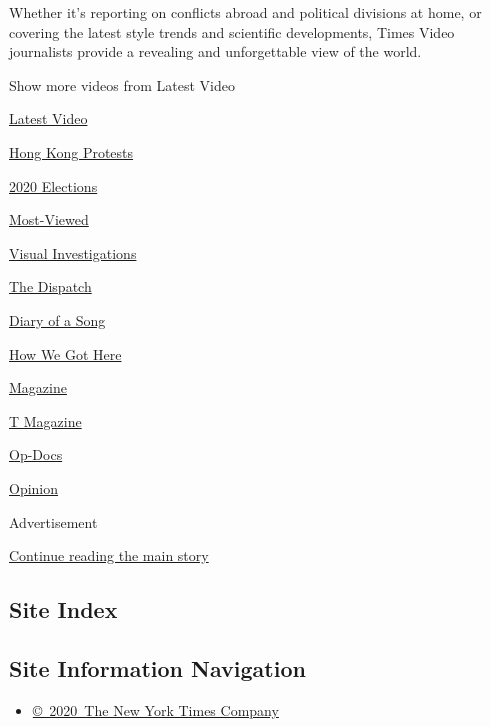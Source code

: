 Whether it's reporting on conflicts abroad and political divisions at
home, or covering the latest style trends and scientific developments,
Times Video journalists provide a revealing and unforgettable view of
the world.

Show more videos from Latest Video

\href{/video}{}

\href{/video/latest-video}{Latest Video}

\href{/video/hk-protest}{Hong Kong Protests}

\href{/video/2020-Elections}{2020 Elections}

\href{/video/Most-Viewed}{Most-Viewed}

\href{/video/investigations}{Visual Investigations}

\href{/video/on-the-ground}{The Dispatch}

\href{/video/diaryofasong}{Diary of a Song}

\href{/video/how-we-got-here}{How We Got Here}

\href{/video/magazine}{Magazine}

\href{/video/t-magazine}{T Magazine}

\href{/video/op-docs}{Op-Docs}

\href{/video/opinion}{Opinion}

Advertisement

\protect\hyperlink{after-bottom}{Continue reading the main story}

\hypertarget{site-index}{%
\subsection{Site Index}\label{site-index}}

\hypertarget{site-information-navigation}{%
\subsection{Site Information
Navigation}\label{site-information-navigation}}

\begin{itemize}
\tightlist
\item
  \href{https://help.nytimes.com/hc/en-us/articles/115014792127-Copyright-notice}{©~2020~The
  New York Times Company}
\end{itemize}


